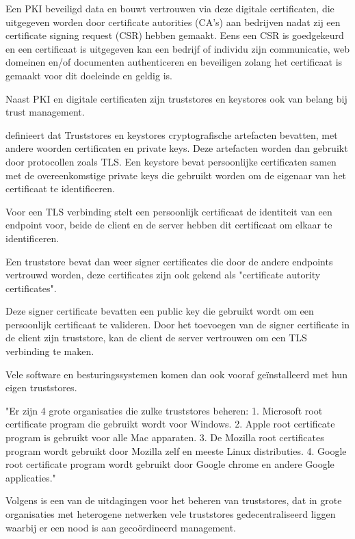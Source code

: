 Een PKI beveiligd data en bouwt vertrouwen via deze digitale certificaten, die uitgegeven worden door certificate autorities (CA's) aan bedrijven nadat zij een certificate signing request (CSR) hebben gemaakt. Eens een CSR is goedgekeurd en een certificaat is uitgegeven kan een bedrijf of individu zijn communicatie, web domeinen en/of documenten authenticeren en beveiligen zolang het certificaat is gemaakt voor dit doeleinde en geldig is. \autocite{GlobalSign}

Naast PKI en digitale certificaten zijn truststores en keystores ook van belang bij trust management.

\textcite{IBM_2023} definieert dat Truststores en keystores cryptografische artefacten bevatten, met andere woorden certificaten en private keys. Deze artefacten worden dan gebruikt door protocollen zoals TLS. Een keystore bevat persoonlijke certificaten samen met de overeenkomstige private keys die gebruikt worden om de eigenaar van het certificaat te identificeren.

Voor een TLS verbinding stelt een persoonlijk certificaat de identiteit van een endpoint voor, beide de client en de server hebben dit certificaat om elkaar te identificeren.

Een truststore bevat dan weer signer certificates die door de andere endpoints vertrouwd worden, deze certificates zijn ook gekend als "certificate autority certificates".

Deze signer certificate bevatten een public key die gebruikt wordt om een persoonlijk certificaat te valideren. Door het toevoegen van de signer certificate in de client zijn truststore, kan de client de server vertrouwen om een TLS verbinding te maken.

Vele software en besturingssystemen komen dan ook vooraf geïnstalleerd met hun eigen truststores.

"Er zijn 4 grote organisaties die zulke truststores beheren: 1. Microsoft root certificate program die gebruikt wordt voor Windows. 2. Apple root certificate program is gebruikt voor alle Mac apparaten. 3. De Mozilla root certificates program wordt gebruikt door Mozilla zelf en meeste Linux distributies. 4. Google root certificate program wordt gebruikt door Google chrome en andere Google applicaties." \autocite{Encrypt_Cons}

Volgens \textcite{SSL_ins} is een van de uitdagingen voor het beheren van truststores, dat in grote organisaties met heterogene netwerken vele truststores gedecentraliseerd liggen waarbij er een nood is aan gecoördineerd management.

